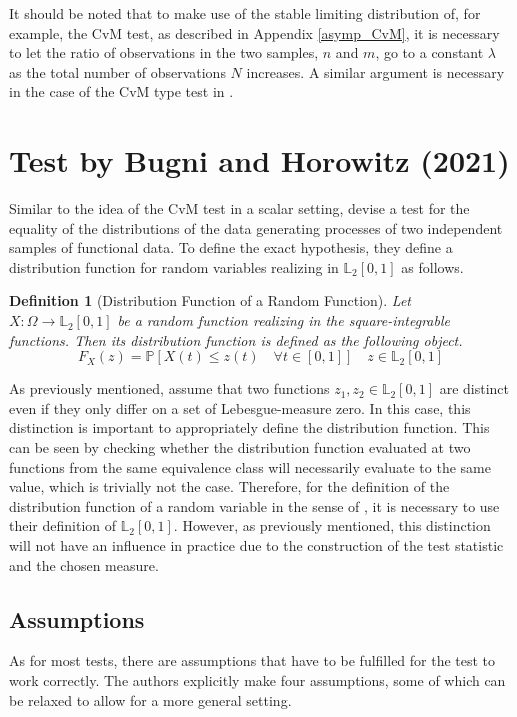 \documentclass[12pt, a4paper]{article}
\theoremstyle{MAstyle} \newtheorem{assumption}{Assumption}[section]
\theoremstyle{MAstyle} \newtheorem{definition}{Definition}[section]
\theoremstyle{MAstyle} \newtheorem{theorem}{Theorem}[section]
\begin{document}
			It should be noted that to make use of the stable limiting distribution of, for example, the CvM test, as described in Appendix \ref{asymp_CvM}, it is necessary to let the ratio of observations in the two samples, $n$ and $m$, go to a constant $\lambda$ as the total number of observations $N$ increases. A similar argument is necessary in the case of the CvM type test in \cite{bugni_permutation_2021}.
		
	\section{Test by Bugni and Horowitz (2021)}\label{Bugni_Horowitz_2021}
	
		Similar to the idea of the CvM test in a scalar setting, \cite{bugni_permutation_2021} devise a test for the equality of the distributions of the data generating processes of two independent samples of functional data. 
		To define the exact hypothesis, they define a distribution function for random variables realizing in $\mathbb{L}_2[0,1]$ as follows.
		\begin{definition}[Distribution Function of a Random Function]\label{dist_func}
			Let $X:\Omega \rightarrow \mathbb{L}_2[0,1]$ be a random function realizing in the square-integrable functions. Then its distribution function is defined as the following object.
			\begin{equation*}
				F_X(z) = \mathbb{P}\left[X(t) \leq z(t) \quad \forall t \in [0,1]\right] \quad z \in \mathbb{L}_2[0,1]
			\end{equation*}
		\end{definition}
		As previously mentioned, \cite{bugni_permutation_2021} assume that two functions $z_1, z_2 \in \mathbb{L}_2[0,1]$ are distinct even if they only differ on a set of Lebesgue-measure zero. In this case, this distinction is important to appropriately define the distribution function. This can be seen by checking whether the distribution function evaluated at two functions from the same equivalence class will necessarily evaluate to the same value, which is trivially not the case. Therefore, for the definition of the distribution function of a random variable in the sense of \cite{bugni_permutation_2021}, it is necessary to use their definition of $\mathbb{L}_2[0,1]$.
		However, as previously mentioned, this distinction will not have an influence in practice due to the construction of the test statistic and the chosen measure.
		
		\subsection{Assumptions}\label{Assumptions}
		As for most tests, there are assumptions that have to be fulfilled for the test to work correctly. The authors explicitly make four assumptions, some of which can be relaxed to allow for a more general setting.
		
\end{document}
